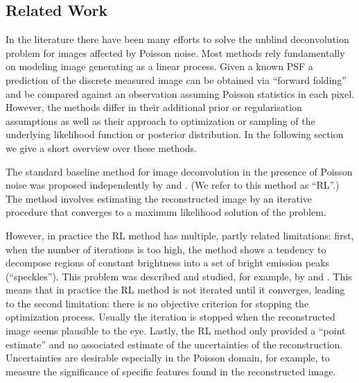 \documentclass[twocolumn]{aastex631}
\newcommand{\as}[1]{{\color{purple} [AS: #1]}}
\begin{document}

    \subsection{Related Work}
    \label{sec:related}
    In the literature there have been many efforts to solve the unblind deconvolution problem for images affected by Poisson noise. Most methods rely fundamentally on modeling image generating as a linear process. Given a known PSF a prediction of the discrete measured image can be obtained via \enquote{forward folding} and be compared against an observation assuming Poisson statistics in each pixel. However, the methods differ in their additional prior or regularisation assumptions as well as their approach to optimization or sampling of the underlying likelihood function or posterior distribution. In the following section we give a short overview over these methods.
    
    The standard baseline method for image deconvolution in the presence of Poisson noise was proposed independently by \cite{Richardson1972} and \cite{Lucy1974}. (We refer to this method as \enquote{RL}.) The method involves estimating the reconstructed image by an iterative procedure that converges to a maximum likelihood solution of the problem.
    
    However, in practice the RL method has multiple, partly related limitations: first, when the number of iterations is too high, the method shows a tendency to decompose regions of constant brightness into a set of bright emission peaks (\enquote{speckles}). This problem was described and studied, for example,  by \cite{Reeves1995} and \cite{Fish1995}. This means that in practice the RL method is not iterated until it converges, leading to the second limitation: there is no objective criterion for stopping the optimization process. Usually the iteration is stopped when the reconstructed image seems plausible to the eye. 
    Lastly, the RL method only provided a \enquote{point estimate} and no associated estimate of the uncertainties of the reconstruction. Uncertainties are desirable especially in the Poisson domain, for example, to measure the significance of specific features found in the reconstructed image.
    
\end{document}
